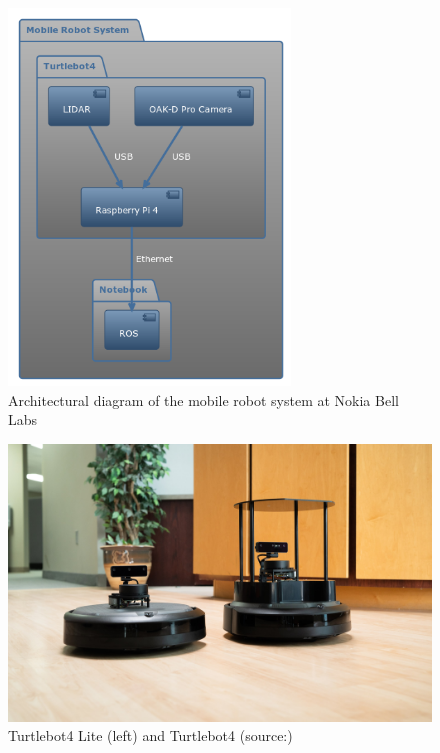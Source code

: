 \begin{figure}[H]
    \centering
    \includegraphics[width=75mm, keepaspectratio]{figures/turtlebot4_architecture.png}
    \caption{Architectural diagram of the mobile robot system at Nokia Bell Labs}
    \label{fig:mobile_robot_architecture}
\end{figure}

\begin{figure}[H]
    \centering
    \includegraphics[width=150mm, keepaspectratio]{figures/TurtleBot4.jpg}
    \caption{Turtlebot4 Lite (left) and Turtlebot4 (source:\cite{Turtlebot4Pic})}
    \label{fig:turtlebot4}
\end{figure}

